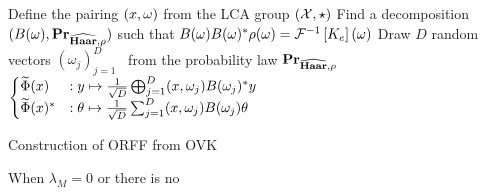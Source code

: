\begin{center}
\begin{algorithm2e}[H]\label{alg:ORFF_construction}
	\SetAlgoLined
    \BlankLine
	Define the pairing $(x, \omega)$ from the \acs{LCA} group $(\mathcal{X}, \star)$\;
	Find a decomposition $(B(\omega),{\mathbf{{Pr}}}_{\widehat{\mathbf{Haar}},\rho})$ such that $B(\omega)B(\omega)^* \rho(\omega)=\mathcal{F}^{-1}\left[K_e\right](\omega)$\;
	Draw $D$ random vectors $(\omega_j)_{j=1}^D$ \iid~from the probability law ${\mathbf{{Pr}}}_{\widehat{\mathbf{Haar}},\rho}$\;
    \Return $\begin{cases}\widetilde{\Phi}(x) &:  y \mapsto \frac{1}{\sqrt{D}}\operatorname*{\bigoplus}_{j=1}^D(x, \omega_j)B(\omega_j)^* y \\ \widetilde{\Phi}(x)^* &: \theta \mapsto \frac{1}{\sqrt{D}} \sum_{j=1}^D (x, \omega_j)B(\omega_j)\theta \end{cases}$\;
    \caption{Construction of \acs{ORFF} from \acs{OVK}}
\end{algorithm2e}
\end{center}
When $\lambda_M=0$ or there is no



